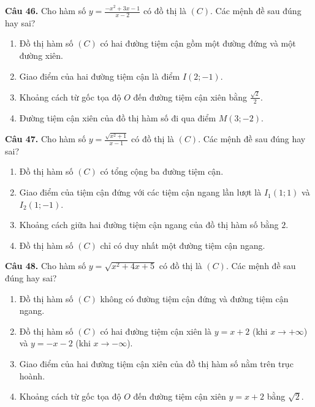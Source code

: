 \documentclass[12pt]{article}
\begin{document}
	\vspace{0.4cm}
	\noindent \textbf{Câu 46.} Cho hàm số $y = \frac{-x^2 + 3x - 1}{x - 2}$ có đồ thị là $(C)$. Các mệnh đề sau đúng hay sai?
	\begin{enumerate}[label=\textbf{\alph*)}]
		\item Đồ thị hàm số $(C)$ có hai đường tiệm cận gồm một đường đứng và một đường xiên.  
		\item Giao điểm của hai đường tiệm cận là điểm $I(2; -1)$.  
		\item Khoảng cách từ gốc tọa độ $O$ đến đường tiệm cận xiên bằng $\frac{\sqrt{2}}{2}$.  
		\item Đường tiệm cận xiên của đồ thị hàm số đi qua điểm $M(3; -2)$.  
	\end{enumerate}
	
	\vspace{0.4cm}
	\noindent \textbf{Câu 47.} Cho hàm số $y = \frac{\sqrt{x^2 + 1}}{x - 1}$ có đồ thị là $(C)$. Các mệnh đề sau đúng hay sai?
	\begin{enumerate}[label=\textbf{\alph*)}]
		\item Đồ thị hàm số $(C)$ có tổng cộng ba đường tiệm cận.  
		\item Giao điểm của tiệm cận đứng với các tiệm cận ngang lần lượt là $I_1(1; 1)$ và $I_2(1; -1)$.  
		\item Khoảng cách giữa hai đường tiệm cận ngang của đồ thị hàm số bằng $2$.  
		\item Đồ thị hàm số $(C)$ chỉ có duy nhất một đường tiệm cận ngang.  
	\end{enumerate}
	
	\vspace{0.4cm}
	\noindent \textbf{Câu 48.} Cho hàm số $y = \sqrt{x^2 + 4x + 5}$ có đồ thị là $(C)$. Các mệnh đề sau đúng hay sai?
	\begin{enumerate}[label=\textbf{\alph*)}]
		\item Đồ thị hàm số $(C)$ không có đường tiệm cận đứng và đường tiệm cận ngang.  
		\item Đồ thị hàm số $(C)$ có hai đường tiệm cận xiên là $y = x + 2$ (khi $x \to +\infty$) và $y = -x - 2$ (khi $x \to -\infty$).  
		\item Giao điểm của hai đường tiệm cận xiên của đồ thị hàm số nằm trên trục hoành.  
		\item Khoảng cách từ gốc tọa độ $O$ đến đường tiệm cận xiên $y = x + 2$ bằng $\sqrt{2}$.  
	\end{enumerate}
	
\end{document}
